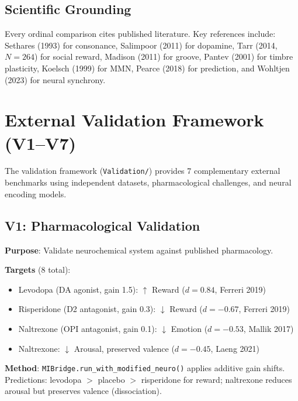 \documentclass[10pt,twocolumn]{article}
\newcommand{\dval}[1]{\ensuremath{d=#1}}
\begin{document}
\subsection{Scientific Grounding}

Every ordinal comparison cites published literature. Key references include: Sethares (1993) for consonance, Salimpoor (2011) for dopamine, Tarr (2014, $N\!=\!264$) for social reward, Madison (2011) for groove, Pantev (2001) for timbre plasticity, Koelsch (1999) for MMN, Pearce (2018) for prediction, and Wohltjen (2023) for neural synchrony.

\section{External Validation Framework (V1--V7)}
\label{sec:validation}

The validation framework (\texttt{Validation/}) provides 7 complementary external benchmarks using independent datasets, pharmacological challenges, and neural encoding models.

\subsection{V1: Pharmacological Validation}

\textbf{Purpose}: Validate neurochemical system against published pharmacology.

\textbf{Targets} (8 total):
\begin{itemize}[nosep,leftmargin=*]
  \item Levodopa (DA agonist, gain 1.5): $\uparrow$ Reward (\dval{0.84}, Ferreri 2019)
  \item Risperidone (D2 antagonist, gain 0.3): $\downarrow$ Reward (\dval{-0.67}, Ferreri 2019)
  \item Naltrexone (OPI antagonist, gain 0.1): $\downarrow$ Emotion (\dval{-0.53}, Mallik 2017)
  \item Naltrexone: $\downarrow$ Arousal, preserved valence (\dval{-0.45}, Laeng 2021)
\end{itemize}

\textbf{Method}: \texttt{MIBridge.run\_with\_modified\_neuro()} applies additive gain shifts. Predictions: levodopa $>$ placebo $>$ risperidone for reward; naltrexone reduces arousal but preserves valence (dissociation).
\end{document}
